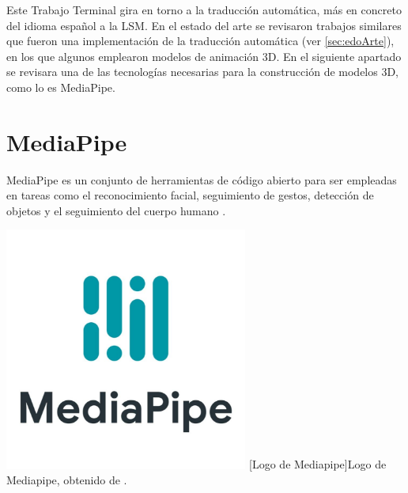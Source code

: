 Este Trabajo Terminal gira en torno a la traducción automática, más en concreto del idioma español a la LSM. En el estado del arte se revisaron trabajos similares que fueron una implementación de la traducción automática (ver \autoref{sec:edoArte}), en los que algunos emplearon modelos de animación 3D. En el siguiente apartado se revisara una de las tecnologías necesarias para la construcción de modelos 3D, como lo es MediaPipe.\\

\section{MediaPipe}
MediaPipe es un conjunto de herramientas de código abierto para ser empleadas en tareas como el reconocimiento facial, seguimiento de gestos, detección de objetos y el seguimiento del cuerpo humano \cite{ref49}.

\begin{center}
    \includegraphics[width=0.6\textwidth]{Images/Cap 2/MediaPipeLogo.jpeg}
    [Logo de Mediapipe]{Logo de Mediapipe, obtenido de \cite{ref50}.} 
\end{center}

\newpage
